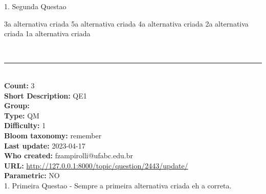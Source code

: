\documentclass[10pt,brazil,a4paper]{exam}
\begin{document}
 \hspace{-1mm} 1. Segunda Questao
\n\n

\vspace{2mm}\begin{oneparchoices}\hspace{-3mm}
\choice {}3a alternativa criada
\choice {}5a alternativa criada
\choice {}4a alternativa criada
\choice {}2a alternativa criada
\choice {}1a alternativa criada
\end{oneparchoices}\vspace{0mm}\\
\noindent\rule{\textwidth}{0.8pt}\\
\noindent\textbf{Count:} 3\\
\noindent\textbf{Short Description:} QE1\\
\noindent\textbf{Group:} \\
\noindent\textbf{Type:} QM\\
\noindent\textbf{Difficulty:} 1\\
\noindent\textbf{Bloom taxonomy:} remember\\
\noindent\textbf{Last update:} 2023-04-17\\
\noindent\textbf{Who created:} fzampirolli@ufabc.edu.br\\
\noindent\textbf{URL:} \url{http://127.0.0.1:8000/topic/question/2443/update/}\\
\noindent\textbf{Parametric:} NO\\

 \hspace{-1mm} 1. Primeira Questao - Sempre a primeira alternativa criada eh a correta.
\n\n
\end{document}
